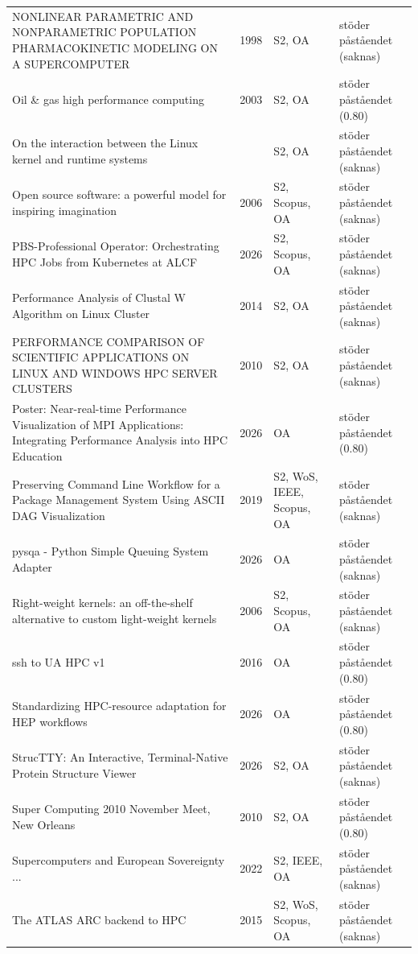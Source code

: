 \begin{longtable}{@{}%
  >{\raggedright\arraybackslash}p{}c%
  >{\raggedright\arraybackslash}p{}%
  >{\raggedright\arraybackslash}p{}@{}}
NONLINEAR PARAMETRIC AND NONPARAMETRIC POPULATION PHARMACOKINETIC MODELING ON A SUPERCOMPUTER & 1998 & S2, OA & stöder påståendet (saknas) \\
Oil \& gas high performance computing & 2003 & S2, OA & stöder påståendet (0.80) \\
On the interaction between the Linux kernel and runtime systems &  & S2, OA & stöder påståendet (saknas) \\
Open source software: a powerful model for inspiring imagination & 2006 & S2, Scopus, OA & stöder påståendet (saknas) \\
PBS-Professional Operator: Orchestrating HPC Jobs from Kubernetes at ALCF & 2026 & S2, Scopus, OA & stöder påståendet (saknas) \\
Performance Analysis of Clustal W Algorithm on Linux Cluster & 2014 & S2, OA & stöder påståendet (saknas) \\
PERFORMANCE COMPARISON OF SCIENTIFIC APPLICATIONS ON LINUX AND WINDOWS HPC SERVER CLUSTERS & 2010 & S2, OA & stöder påståendet (saknas) \\
Poster: Near-real-time Performance Visualization of MPI Applications: Integrating Performance Analysis into HPC Education & 2026 & OA & stöder påståendet (0.80) \\
Preserving Command Line Workflow for a Package Management System Using ASCII DAG Visualization & 2019 & S2, WoS, IEEE, Scopus, OA & stöder påståendet (saknas) \\
pysqa - Python Simple Queuing System Adapter & 2026 & OA & stöder påståendet (saknas) \\
Right-weight kernels: an off-the-shelf alternative to custom light-weight kernels & 2006 & S2, Scopus, OA & stöder påståendet (saknas) \\
ssh to UA HPC v1 & 2016 & OA & stöder påståendet (0.80) \\
Standardizing HPC-resource adaptation for HEP workflows & 2026 & OA & stöder påståendet (0.80) \\
StrucTTY: An Interactive, Terminal-Native Protein Structure Viewer & 2026 & S2, OA & stöder påståendet (saknas) \\
Super Computing 2010 November Meet, New Orleans & 2010 & S2, OA & stöder påståendet (0.80) \\
Supercomputers and European Sovereignty ... & 2022 & S2, IEEE, OA & stöder påståendet (saknas) \\
The ATLAS ARC backend to HPC & 2015 & S2, WoS, Scopus, OA & stöder påståendet (saknas) \\

\end{longtable}
